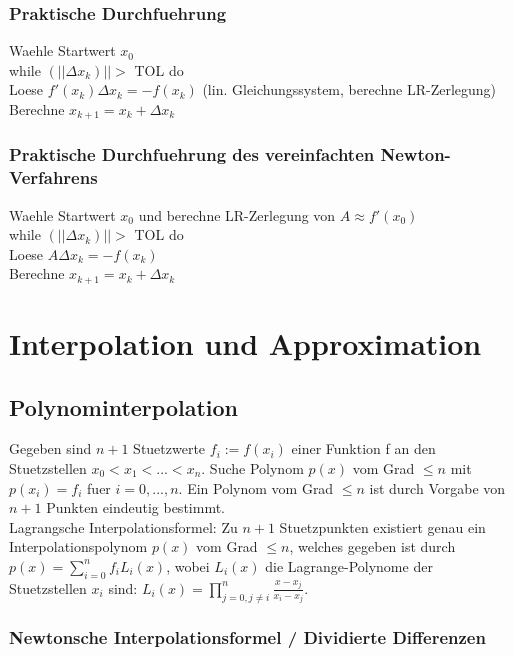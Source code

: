 \documentclass[a4paper]{scrreprt}
\begin{document}
\subsection{Praktische Durchfuehrung}
Waehle Startwert $x_0$\\
while $(|| \Delta x_k)|| >$ TOL do\\
\hspace*{10mm} Loese $f'(x_k) \Delta x_k = -f(x_k)$ (lin. Gleichungssystem, berechne LR-Zerlegung)\\
\hspace*{10mm} Berechne $x_{k+1} = x_k + \Delta x_k$\\

\subsection{Praktische Durchfuehrung des vereinfachten Newton-Verfahrens}
Waehle Startwert $x_0$ und berechne LR-Zerlegung von $A \approx f'(x_0)$\\
while $(|| \Delta x_k)|| >$ TOL do\\
\hspace*{10mm} Loese $A \Delta x_k = -f(x_k)$\\
\hspace*{10mm} Berechne $x_{k+1} = x_k + \Delta x_k$

\chapter{Interpolation und Approximation}

\section{Polynominterpolation}

Gegeben sind $n + 1$ Stuetzwerte $f_i:=f(x_i)$ einer Funktion f an den Stuetzstellen $x_0 < x_1 < ... < x_n$. Suche Polynom $p(x)$ vom Grad $\leq n$ mit $p(x_i) = f_i$ fuer $i = 0,...,n$. Ein Polynom vom Grad $\leq n$ ist durch Vorgabe von $n + 1$ Punkten eindeutig bestimmt.\\

Lagrangsche Interpolationsformel: Zu $n+1$ Stuetzpunkten existiert genau ein Interpolationspolynom $p(x)$ vom Grad $\leq n$, welches gegeben ist durch $p(x) = \sum_{i=0}^n f_i L_i(x)$, wobei $L_i(x)$ die Lagrange-Polynome der Stuetzstellen $x_i$ sind: $L_i(x) = \prod_{j=0, j \neq i}^n \frac{x - x_j}{x_i - x_j}$.

\subsection{Newtonsche Interpolationsformel / Dividierte Differenzen}
\end{document}
